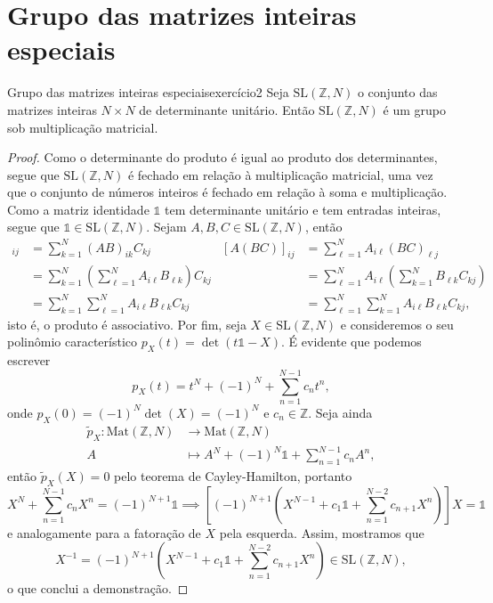 \section{Grupo das matrizes inteiras especiais}
\begin{proposition}{Grupo das matrizes inteiras especiais}{exercício2}
    Seja \(\mathrm{SL}(\mathbb{Z}, N)\) o conjunto das matrizes inteiras \(N \times N\) de determinante unitário. Então \(\mathrm{SL}(\mathbb{Z}, N)\) é um grupo sob multiplicação matricial.
\end{proposition}
\begin{proof}
    Como o determinante do produto é igual ao produto dos determinantes, segue que \(\mathrm{SL}(\mathbb{Z}, N)\) é fechado em relação à multiplicação matricial, uma vez que o conjunto de números inteiros é fechado em relação à soma e multiplicação. Como a matriz identidade \(\mathds{1}\) tem determinante unitário e tem entradas inteiras, segue que \(\mathds{1} \in \mathrm{SL}(\mathbb{Z}, N)\). Sejam \(A, B, C \in \mathrm{SL}(\mathbb{Z}, N)\), então
    \begin{align*}
        [(AB)C]_{ij} &= \sum_{k = 1}^N (AB)_{ik} C_{kj}&
        [A(BC)]_{ij} &= \sum_{\ell = 1}^N A_{i\ell} (BC)_{\ell j}\\
                     &= \sum_{k = 1}^N \left(\sum_{\ell = 1}^N A_{i\ell}B_{\ell k}\right) C_{kj}&
                     &= \sum_{\ell = 1}^N A_{i\ell}\left(\sum_{k = 1}^N B_{\ell k} C_{k j}\right)\\
                     &= \sum_{k = 1}^N \sum_{\ell = 1}^N A_{i\ell} B_{\ell k} C_{kj}&
                     &= \sum_{\ell = 1}^N \sum_{k = 1}^N A_{i\ell} B_{\ell k} C_{k j},
    \end{align*}
    isto é, o produto é associativo. Por fim, seja \(X \in \mathrm{SL}(\mathbb{Z}, N)\) e consideremos o seu polinômio característico \(p_X(t) = \det(t \mathds{1} - X)\). É evidente que podemos escrever
    \begin{equation*}
        p_X(t) = t^N + (-1)^N + \sum_{n=1}^{N-1} c_n t^{n},
    \end{equation*}
    onde \(p_X(0) = (-1)^N\det(X) = (-1)^N\) e \(c_n \in \mathbb{Z}\). Seja ainda
    \begin{align*}
        \tilde{p}_X : \mathrm{Mat}(\mathbb{Z}, N) &\to \mathrm{Mat}(\mathbb{Z}, N)\\
        A &\mapsto A^N + (-1)^N \mathds{1} + \sum_{n=1}^{N-1} c_n A^n,
    \end{align*}
    então \(\tilde{p}_X(X) = 0\) pelo teorema de Cayley-Hamilton, portanto
    \begin{equation*}
        X^N + \sum_{n = 1}^{N-1} c_n X^n = (-1)^{N+1} \mathds{1} \implies \left[(-1)^{N+1} \left(X^{N-1} + c_1 \mathds{1} + \sum_{n=1}^{N-2} c_{n+1} X^{n}\right)\right]X = \mathds{1}
    \end{equation*}
    e analogamente para a fatoração de \(X\) pela esquerda. Assim, mostramos que
    \begin{equation*}
        X^{-1} = (-1)^{N+1} \left(X^{N-1} + c_1 \mathds{1} + \sum_{n=1}^{N-2} c_{n+1} X^{n}\right) \in \mathrm{SL}(\mathbb{Z}, N),
    \end{equation*}
    o que conclui a demonstração.
\end{proof}
